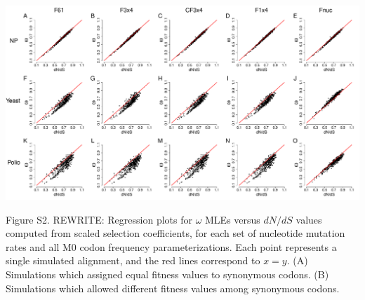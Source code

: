 \documentclass{pnastwo}
\begin{document}
\begin{landscape}
\includegraphics[width=9in]{figures/SI/nyp_truefreqs.pdf}
\vspace{0.5cm}

\noindent Figure S2. REWRITE: Regression plots for $\omega$ MLEs versus $dN/dS$ values computed from scaled selection coefficients, for each set of nucleotide mutation rates and all M0 codon frequency parameterizations. Each point represents a single simulated alignment, and the red lines correspond to $x=y$. (A) Simulations which assigned equal fitness values to synonymous codons. (B) Simulations which allowed different fitness values among synonymous codons.
\end{landscape}
	
\end{document}
